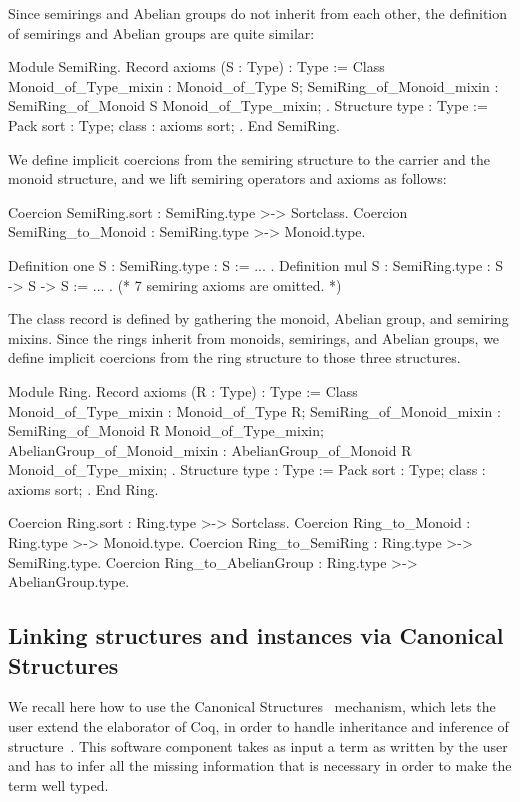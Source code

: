 \documentclass[a4paper,UKenglish,cleveref, autoref]{lipics-v2019}
\newcommand{\mixins}{mixins}
\theoremstyle{implem}
\theoremstyle{implem}
\theoremstyle{command}
\theoremstyle{commands}
\begin{document}
Since semirings and Abelian groups do not inherit from each other,
the definition of semirings and Abelian groups are quite similar:
\begin{coqcode}
Module SemiRing.
Record axioms (S : Type) : Type := Class {
  Monoid_of_Type_mixin : Monoid_of_Type S;
  SemiRing_of_Monoid_mixin : SemiRing_of_Monoid S Monoid_of_Type_mixin;
}.
Structure type : Type := Pack { sort : Type; class : axioms sort; }.
End SemiRing.
\end{coqcode}
We define implicit coercions from the semiring structure to the carrier
and the monoid structure, and we lift semiring operators and axioms as follows:
\begin{coqcode}
Coercion SemiRing.sort : SemiRing.type >-> Sortclass.
Coercion SemiRing_to_Monoid : SemiRing.type >-> Monoid.type.

Definition one {S : SemiRing.type} : S := ... .
Definition mul {S : SemiRing.type} : S -> S -> S := ... .
(* 7 semiring axioms are omitted. *)
\end{coqcode}

The class record is defined by gathering the monoid, Abelian group, and
semiring \mixins{}. Since the rings inherit from monoids, semirings, and
Abelian groups, we define implicit coercions from the ring structure to those
three structures.
\begin{coqcode}
Module Ring.
Record axioms (R : Type) : Type := Class {
  Monoid_of_Type_mixin : Monoid_of_Type R;
  SemiRing_of_Monoid_mixin : SemiRing_of_Monoid R Monoid_of_Type_mixin;
  AbelianGroup_of_Monoid_mixin : AbelianGroup_of_Monoid R Monoid_of_Type_mixin; }.
Structure type : Type := Pack { sort : Type; class : axioms sort; }.
End Ring.

Coercion Ring.sort : Ring.type >-> Sortclass.
Coercion Ring_to_Monoid : Ring.type >-> Monoid.type.
Coercion Ring_to_SemiRing : Ring.type >-> SemiRing.type.
Coercion Ring_to_AbelianGroup : Ring.type >-> AbelianGroup.type.
\end{coqcode}

\subsection{Linking structures and instances via Canonical Structures}

We recall here how to use the Canonical
Structures~\cite{DBLP:conf/itp/MahboubiT13,Saibi99phd} mechanism, which
lets the user extend the elaborator of Coq, in order to handle
inheritance and inference of structure~\cite{affeldt:hal-02463336,KSdraft,DBLP:conf/tphol/GarillotGMR09}.
This software component
takes as input a term as written by the user and has to infer all the missing information that is necessary in order to make the term well typed.
\end{document}
